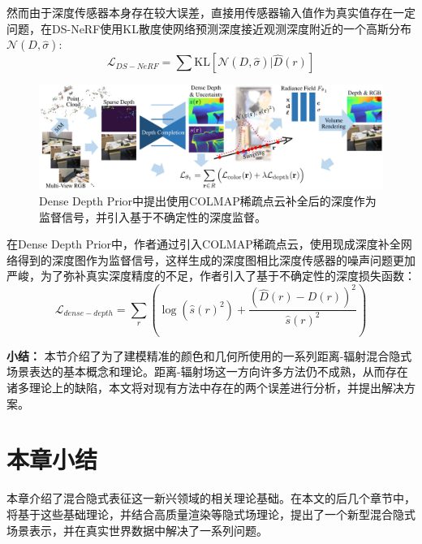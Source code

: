 然而由于深度传感器本身存在较大误差，直接用传感器输入值作为真实值存在一定问题，在DS-NeRF\cite{deng_depth-supervised_2022}使用KL散度使网络预测深度接近观测深度附近的一个高斯分布$\mathcal{N}(D, \hat{\sigma})$:
\begin{equation}
    \mathcal{L}_{DS-NeRF} = \sum\text{KL}[\mathcal{N}(D,\hat{\sigma}) | \hat{D}(r)]
\end{equation}

\begin{figure}[ht]
    \centering
    \includegraphics[width=\textwidth]{undergraduate-thesis/images/related-work/dense-depth prior.png}
    \caption{Dense Depth Prior\cite{roessle_dense_2022}中提出使用COLMAP\cite{schonberger_structure--motion_2016}稀疏点云补全后的深度作为监督信号，并引入基于不确定性的深度监督。}
    \label{fig:related-work dense depth prior}
\end{figure}

在Dense Depth Prior\cite{roessle_dense_2022}中，作者通过引入COLMAP\cite{schonberger_structure--motion_2016}稀疏点云，使用现成深度补全网络得到的深度图作为监督信号，这样生成的深度图相比深度传感器的噪声问题更加严峻，为了弥补真实深度精度的不足，作者引入了基于不确定性的深度损失函数：
\begin{equation}
    \mathcal{L}_{dense-depth}=\sum_r\left(\log(\hat{s}(r)^2)+\frac{(\hat{D}(r)-D(r))^2}{\hat{s}(r)^2}\right)
\end{equation}

\noindent\textbf{小结：} 本节介绍了为了建模精准的颜色和几何所使用的一系列距离-辐射混合隐式场景表达的基本概念和理论。距离-辐射场这一方向许多方法仍不成熟，从而存在诸多理论上的缺陷，本文将对现有方法中存在的两个误差进行分析，并提出解决方案。

\section{本章小结}
本章介绍了混合隐式表征这一新兴领域的相关理论基础。在本文的后几个章节中，将基于这些基础理论，并结合高质量渲染等隐式场理论，提出了一个新型混合隐式场景表示，并在真实世界数据中解决了一系列问题。